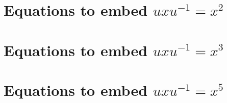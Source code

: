 \documentclass[11pt,letterpaper]{article}
\newcommand{\1}{\mathbb{1}}
\theoremstyle{definition}
\begin{document}
\section{Equations to embed $uxu^{-1} = x^2$}
\label{sec:power2}


\section{Equations to embed $uxu^{-1} = x^3$}
\label{sec:power3}


\section{Equations to embed $uxu^{-1} = x^5$}
\label{sec:power5}

\end{document}
